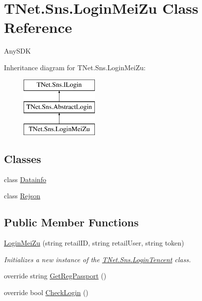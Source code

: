 \hypertarget{class_t_net_1_1_sns_1_1_login_mei_zu}{}\section{T\+Net.\+Sns.\+Login\+Mei\+Zu Class Reference}
\label{class_t_net_1_1_sns_1_1_login_mei_zu}


Any\+S\+DK  


Inheritance diagram for T\+Net.\+Sns.\+Login\+Mei\+Zu\+:\begin{figure}[H]
\begin{center}
\leavevmode
\includegraphics[height=3.000000cm]{class_t_net_1_1_sns_1_1_login_mei_zu}
\end{center}
\end{figure}
\subsection*{Classes}
\begin{DoxyCompactItemize}
\item 
class \mbox{\hyperlink{class_t_net_1_1_sns_1_1_login_mei_zu_1_1_datainfo}{Datainfo}}
\item 
class \mbox{\hyperlink{class_t_net_1_1_sns_1_1_login_mei_zu_1_1_rejson}{Rejson}}
\end{DoxyCompactItemize}
\subsection*{Public Member Functions}
\begin{DoxyCompactItemize}
\item 
\mbox{\hyperlink{class_t_net_1_1_sns_1_1_login_mei_zu_abf60b74152173025a024bd1c21b2bc2f}{Login\+Mei\+Zu}} (string retail\+ID, string retail\+User, string token)
\begin{DoxyCompactList}\small\item\em Initializes a new instance of the \mbox{\hyperlink{class_t_net_1_1_sns_1_1_login_tencent}{T\+Net.\+Sns.\+Login\+Tencent}} class. \end{DoxyCompactList}\item 
override string \mbox{\hyperlink{class_t_net_1_1_sns_1_1_login_mei_zu_a1a3c3c30ba18024e819f0aa8518eedb8}{Get\+Reg\+Passport}} ()
\item 
override bool \mbox{\hyperlink{class_t_net_1_1_sns_1_1_login_mei_zu_a75e7963ccdc475af8d4378efc4becf70}{Check\+Login}} ()
\end{DoxyCompactItemize}
